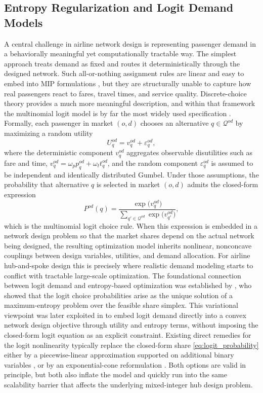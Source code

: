\subsection{Entropy Regularization and Logit Demand Models}
A central challenge in airline network design is representing passenger demand in a behaviorally meaningful yet computationally tractable way. The simplest approach treats demand as fixed and routes it deterministically through the designed network. Such all-or-nothing assignment rules are linear and easy to embed into MIP formulations \cite{Sheffi1985,MagnantiWong1984}, but they are structurally unable to capture how real passengers react to fares, travel times, and service quality. Discrete-choice theory provides a much more meaningful description, and within that framework the multinomial logit model is by far the most widely used specification \cite{BenAkivaLerman1985,Train2009}. Formally, each passenger in market $(o,d)$ chooses an alternative $q\in\mathcal{Q}^{od}$ by maximizing a random utility
\begin{equation}
U^{od}_q=v^{od}_q+\varepsilon^{od}_q,
\label{eq:logit_random_utility}
\end{equation}
where the deterministic component $v^{od}_q$ aggregates observable disutilities such as fare and time, $v^{od}_q=\omega_p p^{od}_q+\omega_t t^{od}_q$, and the random component $\varepsilon^{od}_q$ is assumed to be independent and identically distributed Gumbel. Under those assumptions, the probability that alternative $q$ is selected in market $(o,d)$ admits the closed-form expression
\begin{equation}
P^{od}(q) = \frac{\exp\bigl(v^{od}_q\bigr)}
{\sum_{q'\in\mathcal{Q}^{od}}\exp\bigl(v^{od}_{q'}\bigr)},
\label{eq:logit_probability}
\end{equation}
which is the multinomial logit choice rule. When this expression is embedded in a network design problem so that the market shares depend on the actual network being designed, the resulting optimization model inherits nonlinear, nonconcave couplings between design variables, utilities, and demand allocation. For airline hub-and-spoke design this is precisely where realistic demand modeling starts to conflict with tractable large-scale optimization. The foundational connection between logit demand and entropy-based optimization was established by \cite{Oppenheim1993}, who showed that the logit choice probabilities arise as the unique solution of a maximum-entropy problem over the feasible share simplex. This variational viewpoint was later exploited in \cite{RealRojas2026TRB} to embed logit demand directly into a convex network design objective through utility and entropy terms, without imposing the closed-form logit equation as an explicit constraint. Existing direct remedies for the logit nonlinearity typically replace the closed-form share \eqref{eq:logit_probability} either by a piecewise-linear approximation supported on additional binary variables \cite{Vielma2015}, or by an exponential-cone reformulation \cite{LubinYamangilBentVielma2018}. Both options are valid in principle, but both also inflate the model and quickly run into the same scalability barrier that affects the underlying mixed-integer hub design problem.

